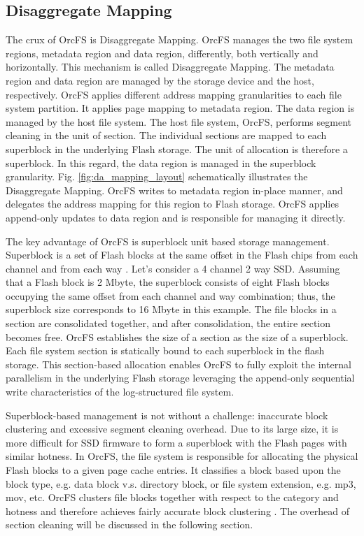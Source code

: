 \documentclass[prodmode,acmtecs]{acmsmall}
\begin{document}
\subsection{Disaggregate Mapping}
\label{subsec:da_mapping}

The crux of OrcFS is Disaggregate Mapping. OrcFS manages the two file
system regions, metadata region and data region, differently, both
vertically and horizontally. This mechanism is
called Disaggregate Mapping. The metadata region and data region are managed by
the storage device and the host, respectively. OrcFS applies different
address mapping granularities to each file system partition. It applies
page mapping to metadata region. The data region is
managed by the host file system. The host file system, OrcFS, performs
segment cleaning in the unit of section. The individual sections are
mapped to each superblock in the underlying Flash storage. The unit of
allocation is therefore a superblock. In this regard, the data region is
managed in the superblock granularity. Fig. \ref{fig:da_mapping_layout}
schematically illustrates the Disaggregate Mapping. OrcFS writes to 
metadata region in-place manner, and delegates the address mapping for
this region to Flash storage. OrcFS applies append-only updates to data
region and is responsible for managing it directly. 

The key advantage of OrcFS is superblock unit based storage
management.  Superblock is a set of Flash blocks at the same offset in
the Flash chips from each channel and from each way
\cite{park2009sub}.  Let's consider a 4 channel 2 way SSD. Assuming that a
Flash block is 2 Mbyte, the superblock consists of eight Flash blocks
occupying the same offset from each channel and way combination; thus, the
superblock size corresponds to 16 Mbyte in this example. The file
blocks in a section are consolidated together, and after
consolidation, the entire section becomes free. OrcFS establishes the
size of a section as the size of a superblock. Each file system section
is statically bound to each superblock in the flash storage. This
section-based allocation enables OrcFS to fully exploit the internal
parallelism in the underlying Flash storage leveraging the append-only
sequential write characteristics of the log-structured file system.

Superblock-based management is not without a challenge: inaccurate
block clustering and excessive segment cleaning overhead. Due to its
large size, it is more difficult for SSD firmware to form a superblock
with the Flash pages with similar hotness. In OrcFS, the file system is
responsible for allocating the physical Flash blocks to a given page
cache entries. It classifies a block based upon the block type,
e.g. data block v.s. directory block, or file system extension,
e.g. mp3, mov, etc. OrcFS clusters file blocks together with
respect to the category and hotness and therefore achieves fairly
accurate block clustering \cite{lee2015f2fs,min2012sfs}.  The
overhead of section cleaning will be discussed in the following
section.
\end{document}
